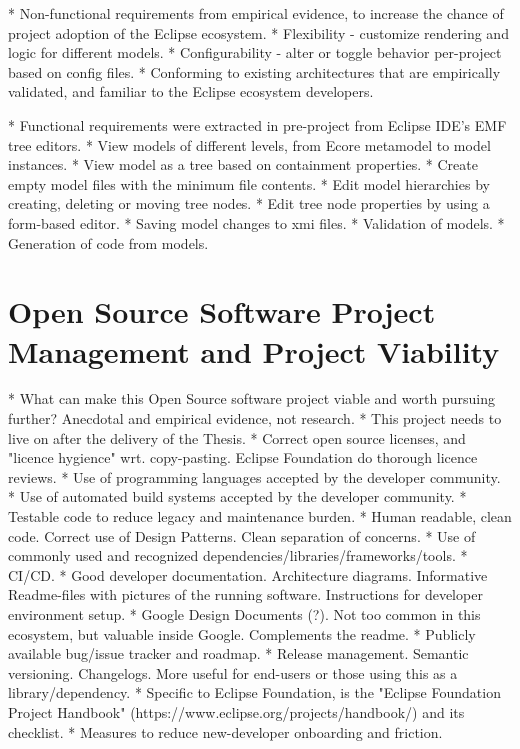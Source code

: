 * Non-functional requirements from empirical evidence, to increase the chance of project adoption of the Eclipse ecosystem.
    * Flexibility - customize rendering and logic for different models.
    * Configurability - alter or toggle behavior per-project based on config files.
    * Conforming to existing architectures that are empirically validated, and familiar to the Eclipse ecosystem developers.

* Functional requirements were extracted in pre-project from Eclipse IDE's EMF tree editors.
  * View models of different levels, from Ecore metamodel to model instances.
  * View model as a tree based on containment properties.
  * Create empty model files with the minimum file contents.
  * Edit model hierarchies by creating, deleting or moving tree nodes.
  * Edit tree node properties by using a form-based editor.
  * Saving model changes to xmi files.
  * Validation of models.
  * Generation of code from models.


\section{Open Source Software Project Management and Project Viability}

* What can make this Open Source software project viable and worth pursuing further? Anecdotal and empirical evidence, not research.
  * This project needs to live on after the delivery of the Thesis.
  * Correct open source licenses, and "licence hygience" wrt. copy-pasting. Eclipse Foundation do thorough licence reviews.
  * Use of programming languages accepted by the developer community.
  * Use of automated build systems accepted by the developer community.
  * Testable code to reduce legacy and maintenance burden.
  * Human readable, clean code. Correct use of Design Patterns. Clean separation of concerns.
  * Use of commonly used and recognized dependencies/libraries/frameworks/tools.
  * CI/CD.
  * Good developer documentation. Architecture diagrams. Informative Readme-files with pictures of the running software. Instructions for developer environment setup.
  * Google Design Documents (?). Not too common in this ecosystem, but valuable inside Google. Complements the readme.
  * Publicly available bug/issue tracker and roadmap.
  * Release management. Semantic versioning. Changelogs. More useful for end-users or those using this as a library/dependency.
  * Specific to Eclipse Foundation, is the "Eclipse Foundation Project Handbook" (https://www.eclipse.org/projects/handbook/) and its checklist.
  * Measures to reduce new-developer onboarding and friction.
